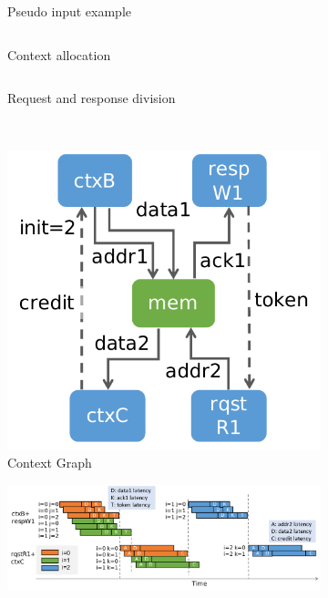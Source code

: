 \begin{figure}
\centering
\begin{subfigure}[b]{0.4\textwidth}
\inputminted{python}{code/spatialeg.py}
\caption{Pseudo input example}
\label{fig:contexteg}
\inputminted{python}{code/contextalloc.py}
\caption{Context allocation}
\end{subfigure}
\hfill
\begin{subfigure}[b]{0.5\textwidth}
\inputminted{python}{code/contextsplit.py}
\caption{Request and response division}
\end{subfigure} \\
\vspace{0.2cm}
\begin{subfigure}[b]{0.23\textwidth}
\includegraphics[width=1\textwidth]{figs/ctxdag.pdf}
\caption{Context Graph}
\end{subfigure}
\begin{subfigure}[b]{0.76\textwidth}
\includegraphics[width=1\textwidth]{figs/plasticinetiming.pdf}

\end{subfigure}
\end{figure}
